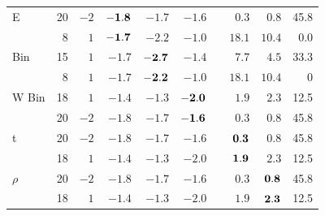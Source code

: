 \documentclass{beamer}
\begin{document}
\begin{frame}
\begin{table}[hbt]
\begin{tabular}{l r rrrr r rrr}
E  & 20 & $-2$ & $\bf -1.8$ & $-1.7$ & $-1.6$ & & $0.3$ & $0.8$  & 45.8 \\[-0.5ex]
		 & 8 & $ 1$ & $\bf -1.7$ & $-2.2$ & $-1.0$ & & $18.1$ & $10.4$ & 0.0 \\[-0.5ex]

Bin  & 15 & $1$ & $-1.7$ & $\bf -2.7$ & $ -1.4$ & & $7.7$ & $4.5$ & 33.3\\[-0.5ex]
	    & 8 & $ 1$ & $-1.7$ & $\bf -2.2$ & $-1.0$ & & $18.1$ & $10.4$ & 0 \\[-0.5ex]
%
W Bin & 18 & $1$ & $-1.4$ & $-1.3$ & $\bf -2.0$ & & $1.9$ & $2.3$ & 12.5 \\[-0.5ex]
		 & 20 & $-2$ & $-1.8$ & $-1.7$ & $\bf -1.6$ & & $0.3$ & $0.8$ & 45.8 \\[-0.5ex]

t   & 20 & $-2$ & $-1.8$ & $-1.7$ & $ -1.6$ & & $\bf 0.3$ & $0.8$ & 45.8 \\[-0.5ex]
		  & 18 & $1$ & $-1.4$ & $-1.3$ & $ -2.0$ & & $\bf 1.9$ & $2.3$ & 12.5\\[-0.5ex]

 $\rho$  & 20 & $-2$ & $-1.8$ & $-1.7$ & $ -1.6$ & & $0.3$ & $\bf 0.8$ & 45.8 \\[-0.5ex]
		   & 18 & $1$ & $-1.4$ & $-1.3$ & $ -2.0$ & & $1.9$ & $\bf 2.3$ & 12.5 \\[-0.5ex]


\end{tabular}
\end{table}
\end{frame}
\end{document}
